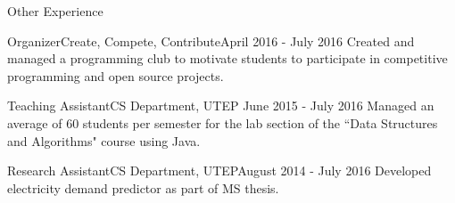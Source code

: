 \documentclass[]{mcdowellcv}
\begin{document}
    \begin{cvsection}{Other Experience}
        \begin{cvsubsection}{Organizer}{Create, Compete, Contribute}{April 2016 - July 2016}
            Created and managed a programming club to motivate students to participate in competitive programming and open source projects.
        \end{cvsubsection}        

        \begin{cvsubsection}{Teaching Assistant}{CS Department, UTEP }{June 2015 - July 2016}
            Managed an average of 60 students per semester for the lab section of the ``Data Structures and Algorithms" course using Java. 
        \end{cvsubsection}
        
        \begin{cvsubsection}{Research Assistant}{CS Department, UTEP}{August 2014 - July 2016}
            Developed electricity demand predictor as part of MS thesis.
        \end{cvsubsection}            
                
    \end{cvsection}
    
\end{document}
